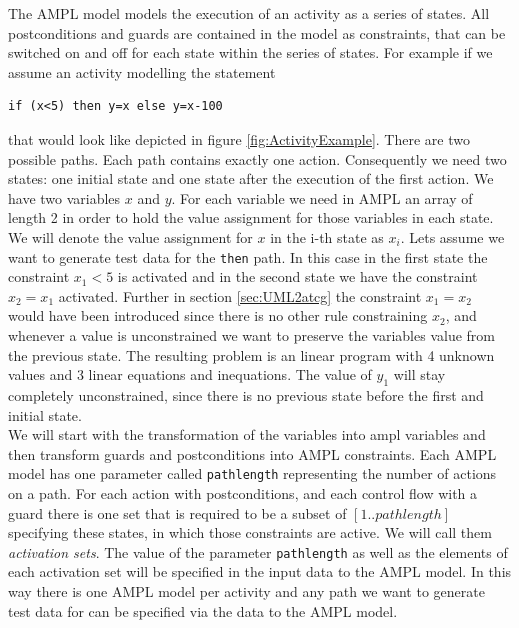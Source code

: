 The AMPL model models the execution of an activity as a series of states. All postconditions and guards are contained in the model as constraints, that can be switched on and off for each state within the series of states. For example if we assume an activity modelling the statement \begin{verbatim}if (x<5) then y=x else y=x-100 \end{verbatim} that would look like depicted in figure \ref{fig:ActivityExample}. There are two possible paths. Each path contains exactly one action. Consequently we need two states: one initial state and one state after the execution of the first action. We have two variables $x$ and $y$. For each variable we need in AMPL an array of length 2 in order to hold the value assignment for those variables in each state. We will denote the value assignment for $x$ in the i-th state as $x_i$. Lets assume we want to generate test data for the \texttt{then} path. In this case in the first state the constraint $x_1<5$ is activated and in the second state we have the constraint $x_2=x_1$ activated. Further in section \ref{sec:UML2atcg} the constraint $x_1=x_2$ would have been introduced since there is no other rule constraining $x_2$, and whenever a value is unconstrained we want to preserve the variables value from the previous state. The resulting problem is an linear program with 4 unknown values and 3 linear equations and inequations. The value of $y_1$ will stay completely unconstrained, since there is no previous state before the first and initial state.\\
We will start with the transformation of the variables into ampl variables and then transform guards and postconditions into AMPL constraints. Each AMPL model has one parameter called \texttt{pathlength} representing the number of actions on a path. For each action with postconditions, and each control flow with a guard there is one set that is required to be a subset of $[1..pathlength]$ specifying these states, in which those constraints are active. We will call them \emph{activation sets}. The value of the parameter \texttt{pathlength} as well as the elements of each activation set will be specified in the input data to the AMPL model. In this way there is one AMPL model per activity and any path we want to generate test data for can be specified via the data to the AMPL model.\\

